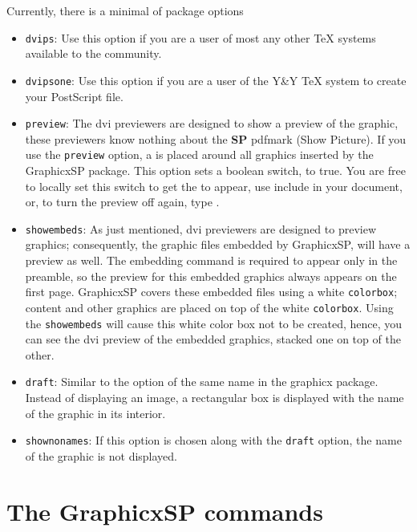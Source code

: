 \documentclass{article}
\let\pkg\textsf
\begin{document}
Currently, there is a minimal of package options

\begin{itemize}
\item \texttt{dvips}: Use this option if you are a user of most any other
    {\TeX} systems available to the community.
\item \texttt{dvipsone}: Use this option if you are a user of the Y{\small\&}\!Y
    {\TeX} system to create your PostScript file.
\item \texttt{preview}: The dvi previewers are designed to show a preview
    of the graphic, these previewers know nothing about the \textbf{SP}
    pdfmark (Show Picture). If you use the \texttt{preview} option, a
     is placed around all graphics inserted by the
    \pkg{GraphicxSP} package. This option sets a boolean switch,
     to true. You are free to locally set this switch to get
    the  to appear, use include  in your document,
    or, to turn the preview off again, type .
\item \texttt{showembeds}: As just mentioned, dvi previewers are
    designed to preview graphics; consequently, the graphic files
    embedded by \pkg{GraphicxSP}, will have a preview as well. The
    embedding command  is required to appear only in
    the preamble, so the preview for this embedded graphics always
    appears on the first page. \pkg{GraphicxSP} covers these embedded
    files using a white \texttt{colorbox}; content and other
    graphics are placed on top of the white \texttt{colorbox}. Using
    the \texttt{showembeds} will cause this white color box not to
    be created, hence, you can see the dvi preview of the embedded
    graphics, stacked one on top of the other.
\item \texttt{draft}: Similar to the option of the same name in the
    graphicx package. Instead of displaying an image, a rectangular
    box is displayed with the name of the graphic in its interior.
\item \texttt{shownonames}: If this option is chosen along with
    the \texttt{draft} option, the name of the graphic is not displayed.
\end{itemize}

\section{The \texorpdfstring{\protect\pkg{GraphicxSP}}{GraphicxSP} commands}
\end{document}
